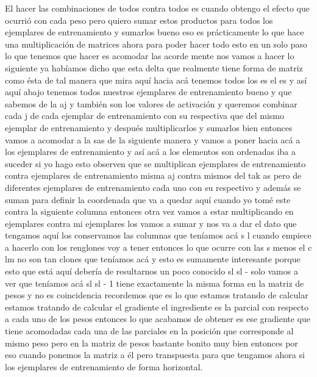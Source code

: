 El hacer las combinaciones de todos contra todos es cuando obtengo el efecto que ocurrió con cada peso pero quiero sumar estos productos para todos los ejemplares de entrenamiento y sumarlos bueno eso es prácticamente lo que hace una multiplicación de matrices ahora para poder hacer todo esto en un solo paso lo que tenemos que hacer es acomodar las acorde mente nos vamos a hacer lo siguiente ya habíamos dicho que esta delta que realmente tiene forma de matriz como ésta de tal manera que mira aquí hacia acá tenemos todos los es el es y así aquí abajo tenemos todos nuestros ejemplares de entrenamiento bueno y que sabemos de la aj y también son los valores de activación y queremos combinar cada j de cada ejemplar de entrenamiento con su respectiva que del mismo ejemplar de entrenamiento y después multiplicarlos y sumarlos bien entonces vamos a acomodar a la sas de la siguiente manera y vamos a poner hacia acá a los ejemplares de entrenamiento y así acá a los elementos son ordenadas iba a suceder si yo hago esto observen que se multiplican ejemplares de entrenamiento contra ejemplares de entrenamiento misma aj contra mismos del tak as pero de diferentes ejemplares de entrenamiento cada uno con su respectivo y además se suman para definir la coordenada que va a quedar aquí cuando yo tomé este contra la siguiente columna entonces otra vez vamos a estar multiplicando en ejemplares contra mi ejemplares los vamos a sumar y nos va a dar el dato que tengamos aquí los conservamos las columnas que teníamos acá s l cuando empiece a hacerlo con los renglones voy a tener entonces lo que ocurre con las s menos el c lm no son tan clones que teníamos acá y esto es sumamente interesante porque esto que está aquí debería de resultarnos un poco conocido sl sl - solo vamos a ver que teníamos acá sl sl - 1 tiene exactamente la misma forma en la matriz de pesos y no es coincidencia recordemos que es lo que estamos tratando de calcular estamos tratando de calcular el gradiente el ingrediente es la parcial con respecto a cada uno de los pesos entonces lo que acabamos de obtener es ese gradiente que tiene acomodadas cada una de las parciales en la posición que corresponde al mismo peso pero en la matriz de pesos bastante bonito muy bien entonces por eso cuando ponemos la matriz a él pero transpuesta para que tengamos ahora si los ejemplares de entrenamiento de forma horizontal. 

